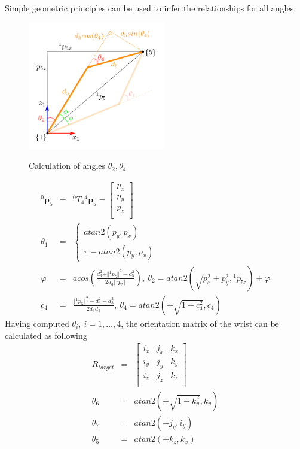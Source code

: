 Simple geometric principles can be used to infer the relationships for all angles.
\begin{center}
\begin{figure}[htbp]
\centering
\includegraphics[width=6cm]{images/th2-4-calculation.png}\\
\caption{Calculation of angles $θ_2, θ_4$}
\label{iiwa14-solution-configurations}
\end{figure}
\end{center}

\begin{eqnarray}
{}^0\mathbf{p}_5 &=& {}^0T_4 {}^4\mathbf{p}_5 = \begin{bmatrix} p_x \\ p_y \\ p_z \\ \end{bmatrix}
\\
θ_1 &=& 
\begin{cases}
atan2 \left( p_y, p_x \right) \\
π - atan2 \left( p_y, p_x \right)
\end{cases}
\\
φ &=& acos \left( \frac{d_3^2 + \Vert{}^1p_{5}\Vert ^2 - d_5^2}{2d_3 \Vert{}^1p_{5}\Vert} \right),
~
θ_2 = atan2 \left( \sqrt{p_x^2 + p_y^2}, {}^1p_{5z} \right) \pm φ
\\
c_4 &=& \frac{ \Vert{}^1p_{5}\Vert ^2 - d_3^2 - d_5^2 }{2d_3d_5},~
θ_4 = atan2 \left( \pm \sqrt{1 - c_4^2}, c_4 \right)
\end{eqnarray}
Having computed $\theta_i,~i=1,\ldots,4$, the orientation matrix of the wrist can be calculated as following
\begin{eqnarray}
R_{target} &=& 
\begin{bmatrix}
i_x & j_x & k_x\\
i_y & j_y & k_y\\
i_z & j_z & k_z\\
\end{bmatrix}
\nonumber
\\
θ_6 &=& atan2 \left( \pm \sqrt{1-k_y^2}, k_y \right)
\\
θ_7 &=& atan2 \left( -j_y, i_y \right)
\\
θ_5 &=& atan2 \left( - k_z, k_x \right)
\end{eqnarray}

